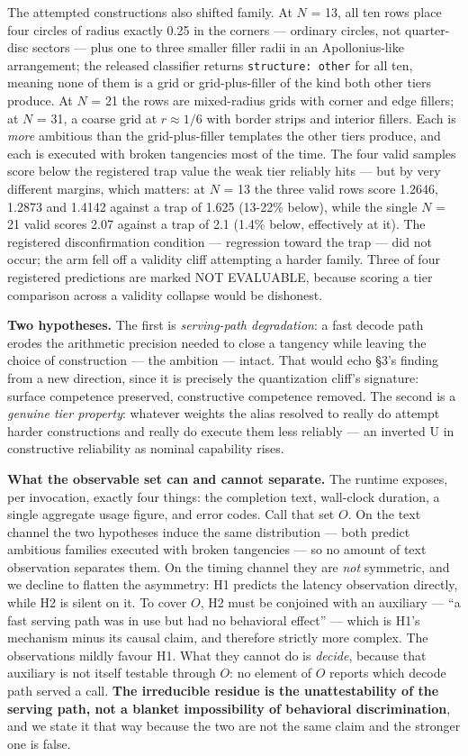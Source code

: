 \documentclass[11pt]{article}
\begin{document}
The attempted constructions also shifted family. At $N$ = 13, all ten rows place four
circles of radius exactly 0.25 in the corners --- ordinary circles, not quarter-disc
sectors --- plus one to three smaller filler radii in an Apollonius-like arrangement; the
released classifier returns \texttt{structure: other} for all ten, meaning none of them is a
grid or grid-plus-filler of the kind both other tiers produce. At $N$ = 21 the rows are
mixed-radius grids with corner and edge fillers; at $N$ = 31, a coarse grid at $r \approx 1/6$ with
border strips and interior fillers. Each is \emph{more} ambitious than the grid-plus-filler
templates the other tiers produce, and each is executed with broken tangencies most of
the time. The four valid samples score below the registered trap value the weak tier
reliably hits --- but by very different margins, which matters: at $N$ = 13 the three valid
rows score 1.2646, 1.2873 and 1.4142 against a trap of 1.625 (13-22\% below), while the
single $N$ = 21 valid scores 2.07 against a trap of 2.1 (1.4\% below, effectively at it).
The registered disconfirmation condition --- regression toward the trap --- did not occur;
the arm fell off a validity cliff attempting a harder family. Three of four registered
predictions are marked NOT EVALUABLE, because scoring a tier comparison across a validity
collapse would be dishonest.

\textbf{Two hypotheses.} The first is \emph{serving-path degradation}: a fast decode path erodes
the arithmetic precision needed to close a tangency while leaving the choice of
construction --- the ambition --- intact. That would echo \S3's finding from a new
direction, since it is precisely the quantization cliff's signature: surface competence
preserved, constructive competence removed. The second is a \emph{genuine tier property}:
whatever weights the alias resolved to really do attempt harder constructions and
really do execute them less reliably --- an inverted U in constructive reliability as
nominal capability rises.

\textbf{What the observable set can and cannot separate.} The runtime exposes, per invocation,
exactly four things: the completion text, wall-clock duration, a single aggregate usage
figure, and error codes. Call that set \emph{$O$}. On the text channel the two hypotheses induce
the same distribution --- both predict ambitious families executed with broken tangencies ---
so no amount of text observation separates them. On the timing channel they are \emph{not}
symmetric, and we decline to flatten the asymmetry: H1 predicts the latency observation
directly, while H2 is silent on it. To cover \emph{$O$}, H2 must be conjoined with an auxiliary ---
``a fast serving path was in use but had no behavioral effect'' --- which is H1's mechanism
minus its causal claim, and therefore strictly more complex. The observations mildly
favour H1. What they cannot do is \emph{decide}, because that auxiliary is not itself testable
through \emph{$O$}: no element of \emph{$O$} reports which decode path served a call. \textbf{The
irreducible residue is the unattestability of the serving path, not a blanket
impossibility of behavioral discrimination}, and we state it that way because the two
are not the same claim and the stronger one is false.
\end{document}
